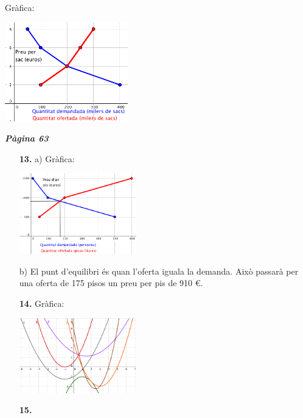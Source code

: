 \documentclass[a4paper, pdf, twoside]{book}
\begin{document}
\begin{multicols}{2}
\begin{enumerate}
Gràfica:\par \includegraphics [width=0.4\textwidth ]{img-sol/t5-12}
 \end{enumerate}
\vspace{0.3cm}


{\textbf{\em Pàgina 63}} \hrulefill
\begin{enumerate}
\vspace{0.25cm}
\item[\fontfamily{phv}\selectfont\color{blue}\textbf{13. }] 
a) Gràfica:\par \includegraphics [width=0.4\textwidth ]{img-sol/t5-13}\par b) El punt d'equilibri és quan l'oferta iguala la demanda. Això passarà per una oferta de 175 pisos un preu per pis de 910 \euro {}.
 \end{enumerate}
\begin{enumerate}
\vspace{0.25cm}
\item[\fontfamily{phv}\selectfont\color{blue}\textbf{14. }] 
Gràfica: \par \includegraphics [width=0.4\textwidth ]{img-sol/t5-14}
\vspace{0.25cm}
\item[\fontfamily{phv}\selectfont\color{blue}\textbf{15. }] 

\end{enumerate}
\end{multicols}
\end{document}

